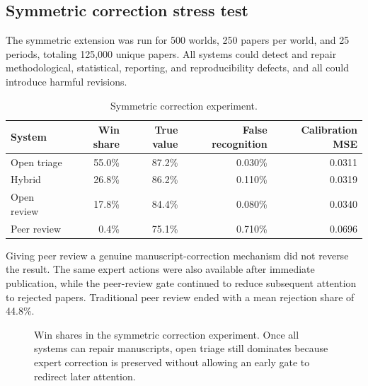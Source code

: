 \subsection{Symmetric correction stress test}

The symmetric extension was run for 500 worlds, 250 papers per world, and 25 periods, totaling 125,000 unique papers. All systems could detect and repair methodological, statistical, reporting, and reproducibility defects, and all could introduce harmful revisions.

\begin{table}[ht]
\centering
\caption{Symmetric correction experiment.}
\label{tab:symmetric}
\small
\begin{tabular}{lrrrr}
\toprule
System & Win share & True value & False recognition & Calibration MSE\\
\midrule
Open triage & 55.0\% & 87.2\% & 0.030\% & 0.0311\\
Hybrid & 26.8\% & 86.2\% & 0.110\% & 0.0319\\
Open review & 17.8\% & 84.4\% & 0.080\% & 0.0340\\
Peer review & 0.4\% & 75.1\% & 0.710\% & 0.0696\\
\bottomrule
\end{tabular}
\end{table}

Giving peer review a genuine manuscript-correction mechanism did not reverse the result. The same expert actions were also available after immediate publication, while the peer-review gate continued to reduce subsequent attention to rejected papers. Traditional peer review ended with a mean rejection share of 44.8\%.


\begin{figure}[ht]
\centering
{}
\caption{Win shares in the symmetric correction experiment. Once all systems can repair manuscripts, open triage still dominates because expert correction is preserved without allowing an early gate to redirect later attention.}
\label{fig:symmetric_wins}
\end{figure}

